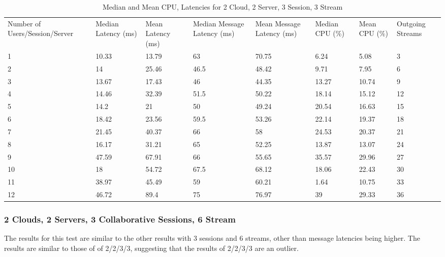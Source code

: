 \begin{table}
\caption{Median and Mean CPU, Latencies for 2 Cloud, 2 Server, 3 Session, 3 Stream}
\label{table:2cld_2serv_3sess_3str}
\begin{tabu} to\linewidth{|X[c]|X[c]|X[c]|X[c]|X[c]|X[c]|X[c]|X[c]|}
\everyrow{\hline}
\hline
Number of Users/Session/Server & Median Latency (ms) & Mean Latency (ms) & Median Message Latency (ms) & Mean Message Latency (ms) & Median CPU (\%) & Mean CPU (\%) & Outgoing Streams\\
1 & 10.33 & 13.79 & 63 & 70.75 & 6.24 & 5.08 & 3 \\
2 & 14 & 25.46 & 46.5 & 48.42 & 9.71 & 7.95 & 6 \\
3 & 13.67 & 17.43 & 46 & 44.35 & 13.27 & 10.74 & 9 \\
4 & 14.46 & 32.39 & 51.5 & 50.22 & 18.14 & 15.12 & 12 \\
5 & 14.2 & 21 & 50 & 49.24 & 20.54 & 16.63 & 15 \\
6 & 18.42 & 23.56 & 59.5 & 53.26 & 22.14 & 19.37 & 18 \\
7 & 21.45 & 40.37 & 66 & 58 & 24.53 & 20.37 & 21 \\
8 & 16.17 & 31.21 & 65 & 52.25 & 13.87 & 13.07 & 24 \\
9 & 47.59 & 67.91 & 66 & 55.65 & 35.57 & 29.96 & 27 \\
10 & 18 & 54.72 & 67.5 & 68.12 & 18.06 & 22.43 & 30 \\
11 & 38.97 & 45.49 & 59 & 60.21 & 1.64 & 10.75 & 33 \\
12 & 46.72 & 89.4 & 75 & 76.97 & 39 & 29.33 & 36 \\
\end{tabu}
\end{table}


\clearpage\subsubsection{2 Clouds, 2 Servers, 3 Collaborative Sessions, 6 Stream}

The results for this test are similar to the other results with 3 sessions and 6 streams, other than message latencies being higher. The results are similar to those of of 2/2/3/3, suggesting that the results of 2/2/3/3 are an outlier.

